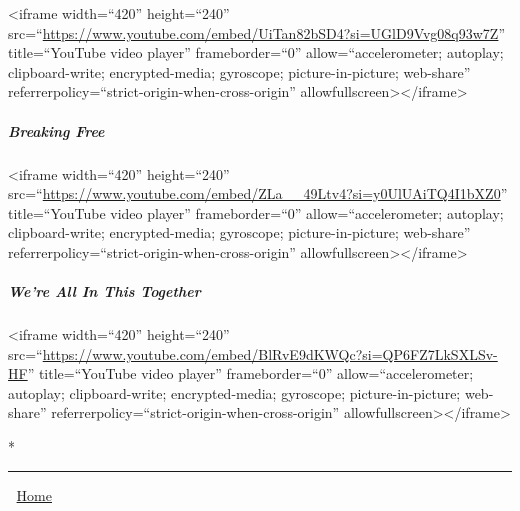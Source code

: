 \documentclass[11pt]{article}
\begin{document}
<iframe width=``420'' height=``240''
src=``\url{https://www.youtube.com/embed/UiTan82bSD4?si=UGlD9Vvg08q93w7Z}'' title=``YouTube video player'' frameborder=``0'' allow=``accelerometer; autoplay; clipboard-write; encrypted-media; gyroscope; picture-in-picture; web-share'' referrerpolicy=``strict-origin-when-cross-origin'' allowfullscreen></iframe>
\subparagraph*{Breaking Free}
\label{sec:org127c02a}

<iframe width=``420'' height=``240''
src=``\url{https://www.youtube.com/embed/ZLa\_\_49Ltv4?si=y0UlUAiTQ4I1bXZ0}'' title=``YouTube video player'' frameborder=``0'' allow=``accelerometer; autoplay; clipboard-write; encrypted-media; gyroscope; picture-in-picture; web-share'' referrerpolicy=``strict-origin-when-cross-origin'' allowfullscreen></iframe>
\subparagraph*{We're All In This Together}
\label{sec:org6b9a6e8}

<iframe width=``420'' height=``240''
src=``\url{https://www.youtube.com/embed/BlRvE9dKWQc?si=QP6FZ7LkSXLSv-HF}'' title=``YouTube video player'' frameborder=``0'' allow=``accelerometer; autoplay; clipboard-write; encrypted-media; gyroscope; picture-in-picture; web-share'' referrerpolicy=``strict-origin-when-cross-origin'' allowfullscreen></iframe>

*

\noindent\rule{\textwidth}{0.5pt}
\begin{HTML}
🔗 \href{https://sendagirich.github.io/asuka/vl\_index.html}{Home}
\end{HTML}
\end{document}
